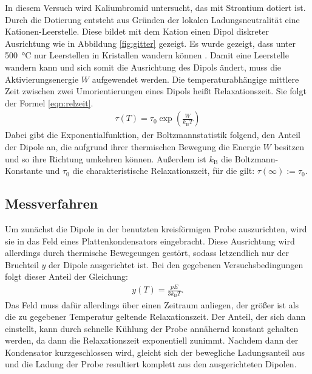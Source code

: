 In diesem Versuch wird Kaliumbromid untersucht, das mit Strontium dotiert ist. Durch die Dotierung entsteht aus Gründen der lokalen Ladungsneutralität eine Kationen-Leerstelle. Diese bildet mit dem Kation einen Dipol diskreter Ausrichtung wie in Abbildung \ref{fig:gitter} gezeigt. Es wurde gezeigt, dass unter \SI{500}{\celsius} nur Leerstellen in Kristallen wandern können \cite{wjost}. Damit eine Leerstelle wandern kann und sich somit die Ausrichtung des Dipols ändert, muss die Aktivierungsenergie $W$ aufgewendet werden. Die temperaturabhängige mittlere Zeit zwischen zwei Umorientierungen eines Dipols heißt Relaxationszeit. Sie folgt der Formel \eqref{eqn:relzeit}.
\begin{align}
  \tau(T) = \tau_0 \exp\left(\frac{W}{k_\text{B} T}\right) \label{eqn:relzeit}
\end{align}
Dabei gibt die Exponentialfunktion, der Boltzmannstatistik folgend, den Anteil der Dipole an, die aufgrund ihrer thermischen Bewegung die Energie $W$ besitzen und so ihre Richtung umkehren können.
Außerdem ist $k_\text{B}$ die Boltzmann-Konstante und $\tau_0$ die charakteristische Relaxationszeit, für die gilt: $\tau(\infty) := \tau_0$.

\subsection{Messverfahren}

Um zunächst die Dipole in der benutzten kreisförmigen Probe auszurichten, wird sie in das Feld eines Plattenkondensators eingebracht. Diese Ausrichtung wird allerdings durch thermische Bewegeungen gestört, sodass letzendlich nur der Bruchteil $y$ der Dipole ausgerichtet ist. Bei den gegebenen Versuchsbedingungen folgt dieser Anteil der Gleichung:
\begin{align}
  y(T) = \frac{pE}{3k_\text{B}T}.
\end{align}
Das Feld muss dafür allerdings über einen Zeitraum anliegen, der größer ist als die zu gegebener Temperatur geltende Relaxationszeit.
Der Anteil, der sich dann einstellt, kann durch schnelle Kühlung der Probe annähernd konstant gehalten werden, da dann die Relaxationszeit exponentiell zunimmt. Nachdem dann der Kondensator kurzgeschlossen wird, gleicht sich der bewegliche Ladungsanteil aus und die Ladung der Probe resultiert komplett aus den ausgerichteten Dipolen.


